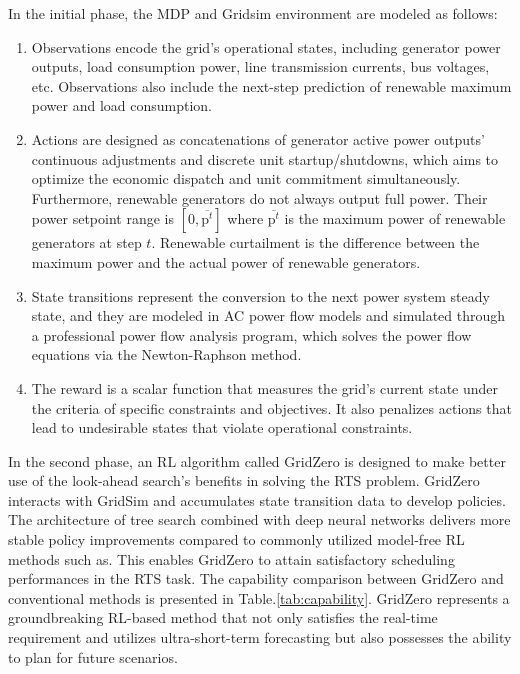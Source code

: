 In the initial phase, 
the MDP and Gridsim environment are modeled as follows:
\begin{enumerate}[label=(\arabic*)]
    \item Observations encode the grid's operational states, including generator power outputs, load consumption power, line transmission currents, bus voltages, etc. Observations also include the next-step prediction of renewable maximum power and load consumption.
    \item Actions are designed as concatenations of generator active power outputs' continuous adjustments and discrete unit startup/shutdowns, 
    which aims to optimize the economic dispatch and unit commitment simultaneously. Furthermore, renewable generators do not always output full power. Their power setpoint range is $[0, \overline{\text{p}^t}]$ where $\overline{\text{p}^t}$ is the maximum power of renewable generators at step $t$. Renewable curtailment is the difference between the maximum power and the actual power of renewable generators.
    \item State transitions represent the conversion to the next power system steady state, and they are modeled in AC power flow models and simulated through a professional power flow analysis program, which solves the power flow equations via the Newton-Raphson method. 
    \item The reward is a scalar function that measures the grid's current state under the criteria of specific constraints and objectives. It also penalizes actions that lead to undesirable states that violate operational constraints.
\end{enumerate}


In the second phase, an RL algorithm called GridZero is designed to make better use of the look-ahead search's benefits in solving the RTS problem. GridZero interacts with GridSim and accumulates state transition data to develop policies.
The architecture of tree search combined with deep neural networks delivers more stable policy improvements compared to commonly utilized model-free RL methods such as\cite{lillicrap2015continuous,haarnoja2018soft}. This enables GridZero to attain satisfactory scheduling performances in the RTS task. 
The capability comparison between GridZero and conventional methods is presented in Table.\ref{tab:capability}. GridZero represents a groundbreaking RL-based method that not only satisfies the real-time requirement and utilizes ultra-short-term forecasting but also possesses the ability to plan for future scenarios.


